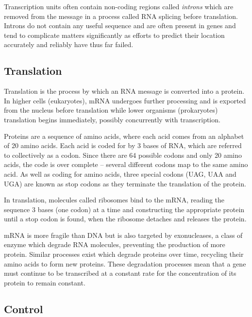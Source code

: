 Transcription units often contain non-coding regions called \textit{introns}
which are removed from the message in a process called RNA splicing 
before translation.
Introns do not contain any useful sequence and are often present in genes and
tend to complicate matters significantly as efforts to predict their location 
accurately and reliably have thus far failed.

\subsection{Translation}
\label{sec:translation}

Translation is the process by which an RNA message is converted into a protein.
In higher cells (eukaryotes), mRNA undergoes further processing and is exported
from the nucleus before translation while lower organisms (prokaryotes)
translation begins immediately, possibly concurrently with
transcription.

Proteins are a sequence of amino acids, where each acid comes from an alphabet
of 20 amino acids.
Each acid is coded for by 3 bases of RNA, which are referred to collectively 
as a codon.
Since there are 64 possible codons and only 20 amino acids, the code is
over complete -- several different codons map to the same amino acid.
As well as coding for amino acids, three special codons (UAG, UAA and UGA) are
known as stop codons as they terminate the translation of the protein.

In translation, molecules called ribosomes bind to the mRNA, reading the
sequence 3 bases (one codon) at a time and constructing the appropriate protein
until a stop codon is found, when the ribosome detaches and releases the
protein.

mRNA is more fragile than DNA but is also targeted by exonucleases, a class of
enzyme which degrade RNA molecules, preventing the production of more protein.
Similar processes exist which degrade proteins over time, recycling their amino
acids to form new proteins.
These degradation processes mean that a gene must continue to be transcribed at
a constant rate for the concentration of its protein to remain constant.

\subsection{Control}
\label{sec:mbio_control}

